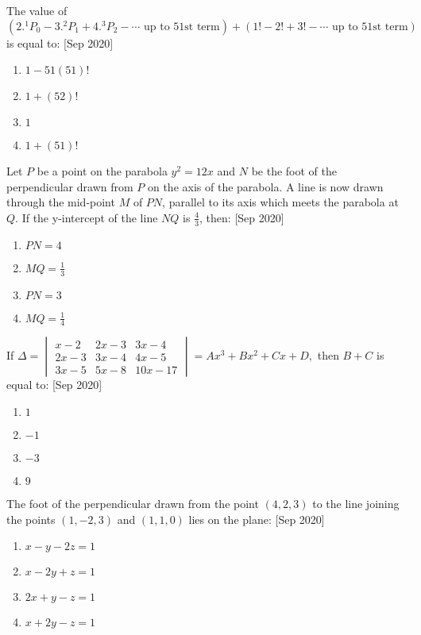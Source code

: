 \iffalse
\title{2020}
\author{AI24BTECH11012}
\section{mcq-single}
\fi
    \item The value of $ (2.^1P_0 - 3.^2P_1 + 4.^3P_2 - \cdots \text{ up to 51st term}) + (1! - 2! + 3! - \cdots \text{ up to 51st term}) $ 
    is equal to:
    \hfill{[Sep 2020]}
    \begin{enumerate}
        \item $ 1 - 51(51)! $
        \item $ 1 + (52)! $
        \item $ 1 $
        \item $ 1 + (51)! $
    \end{enumerate}

    \item Let $P$ be a point on the parabola $ y^2 = 12x $ and $ N $ be the foot of the perpendicular drawn from $ P $ on the axis of the parabola. A line is now drawn through the mid-point $ M $ of $ PN $, parallel to its axis which meets the parabola at $ Q $. If the y-intercept of the line $ NQ $ is $ \frac{4}{3} $, then:
    \hfill{[Sep 2020]}
    \begin{enumerate}
        \item $ PN = 4 $
        \item $ MQ = \frac{1}{3} $
        \item $ PN = 3 $
        \item $ MQ = \frac{1}{4} $
    \end{enumerate}

    \item If $ \Delta = \begin{vmatrix}
    x-2 & 2x-3 & 3x-4 \\
    2x-3 & 3x-4 & 4x-5 \\
    3x-5 & 5x-8 & 10x-17
    \end{vmatrix} = Ax^3 + Bx^2 + Cx + D, $ 
    then $ B + C $ is equal to:
    \hfill{[Sep 2020]}
    \begin{enumerate}
        \item $ 1 $
        \item $ -1 $
        \item $ -3 $
        \item $ 9 $
    \end{enumerate}

    \item The foot of the perpendicular drawn from the point $ (4, 2, 3) $ to the line joining the points $ (1, -2, 3) $ and $ (1, 1, 0) $ lies on the plane:
    \hfill{[Sep 2020]}
    \begin{enumerate}
        \item $ x - y - 2z = 1 $
        \item $ x - 2y + z = 1 $
        \item $ 2x + y - z = 1 $
        \item $ x + 2y - z = 1 $
    \end{enumerate}

